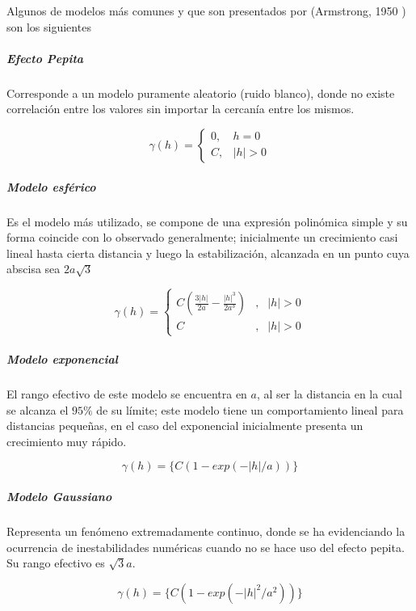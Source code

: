  Algunos de modelos más comunes y que son presentados por (Armstrong, 1950 )\cite{armstrong} son los siguientes

\subparagraph{Efecto Pepita}

Corresponde a un modelo puramente aleatorio (ruido blanco), donde no existe correlación entre los
valores sin importar la cercanía entre los mismos.

\begin{equation*}
\gamma(h) = 
\left\{ 
\begin{aligned}
0  ,&   h =0\\
C ,& |h| > 0
\end{aligned}
\right.
\end{equation*}

\subparagraph{Modelo esférico}

Es el modelo más utilizado, se compone de una expresión polinómica simple y su forma coincide con
lo observado generalmente; inicialmente un crecimiento casi lineal hasta cierta distancia y luego la
estabilización, alcanzada en un punto cuya abscisa sea $2a\sqrt{3}$

\begin{equation*}
\gamma(h) = 
\left\{ 
\begin{aligned}
C\left( \frac{3|h|}{2a} - \frac{|h|^3}{2a^3}\right) & ,   & |h| > 0\\
C & ,   & |h| > 0
\end{aligned}
\right.
\end{equation*}


\subparagraph{Modelo exponencial}
El rango efectivo de este modelo se encuentra en $a$, al ser la distancia en la cual se alcanza el $95\%$ de su límite; este modelo tiene un comportamiento lineal para distancias pequeñas, en el caso del exponencial inicialmente presenta un crecimiento muy rápido.

\begin{equation*}
\gamma(h) = 
\{C (1- exp(-|h|/a))\}
\end{equation*}

\subparagraph{Modelo Gaussiano}
Representa un fenómeno extremadamente continuo, donde se ha evidenciando la ocurrencia de
inestabilidades numéricas cuando no se hace uso del efecto pepita. Su rango efectivo es $\sqrt{3}a$.


\begin{equation*}
\gamma(h) = 
\{C (1- exp(-|h|^2/a^2))\}
\end{equation*}






